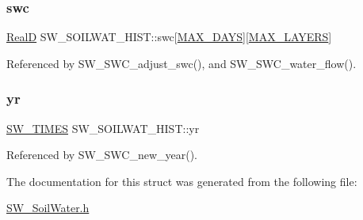 \subsubsection{\texorpdfstring{swc}{swc}}
{\footnotesize\ttfamily \hyperlink{generic_8h_af1c105fd5732f70b91ddaeda0cc340e3}{RealD} S\+W\+\_\+\+S\+O\+I\+L\+W\+A\+T\+\_\+\+H\+I\+S\+T\+::swc\mbox{[}\hyperlink{_times_8h_a01f08d46080872b9f4284873b7f9dee4}{M\+A\+X\+\_\+\+D\+A\+YS}\mbox{]}\mbox{[}\hyperlink{_s_w___defines_8h_ade9d4b2ac5f29fe89ffea40e7c58c9d6}{M\+A\+X\+\_\+\+L\+A\+Y\+E\+RS}\mbox{]}}



Referenced by S\+W\+\_\+\+S\+W\+C\+\_\+adjust\+\_\+swc(), and S\+W\+\_\+\+S\+W\+C\+\_\+water\+\_\+flow().

\mbox{\label{struct_s_w___s_o_i_l_w_a_t___h_i_s_t_ad6320d1a34ad896d6cf43162fa30c7b4}} 
\subsubsection{\texorpdfstring{yr}{yr}}
{\footnotesize\ttfamily \hyperlink{struct_s_w___t_i_m_e_s}{S\+W\+\_\+\+T\+I\+M\+ES} S\+W\+\_\+\+S\+O\+I\+L\+W\+A\+T\+\_\+\+H\+I\+S\+T\+::yr}



Referenced by S\+W\+\_\+\+S\+W\+C\+\_\+new\+\_\+year().



The documentation for this struct was generated from the following file\+:\begin{DoxyCompactItemize}
\item 
\hyperlink{_s_w___soil_water_8h}{S\+W\+\_\+\+Soil\+Water.\+h}\end{DoxyCompactItemize}
